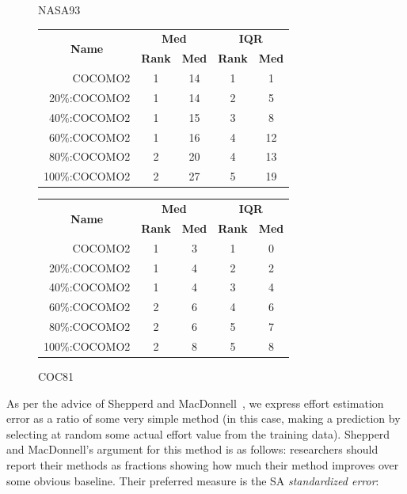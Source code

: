 \documentclass[final,twocolumn]{elsarticle}
\theoremstyle{break}
\begin{document}
\begin{figure}[!t]
\begin{center}
\caption{NASA93}
\scriptsize
\label{fig:nasa93}
\begin{tabular}{|r|c|c|c|c|}
\hline
\multicolumn{1}{|c|}{\multirow{2}{*}{\textbf{Name}}} & \multicolumn{2}{c|}{\textbf{Med}}     & \multicolumn{2}{c|}{\textbf{IQR}} \\ \cline{2-5} 
\multicolumn{1}{|c|}{}                               & \textbf{Rank} & \textbf{Med} & \textbf{Rank} & \textbf{Med} \\ \hline
    COCOMO2  & 1 & 14   & 1    & 1     \\ \cline{4-5}
20\%:COCOMO2 & 1 & 14   & 2    & 5  \\ \cline{4-5}
40\%:COCOMO2 & 1 & 15   & 3    & 8   \\ \cline{4-5}
60\%:COCOMO2 & 1 & 16   & 4    & 12   \\ \cline{2-3}
80\%:COCOMO2 & 2 & 20   & 4    & 13   \\\cline{4-5}
100\%:COCOMO2 & 2 & 27  & 5    & 19    \\ \hline  
\end{tabular}

\caption{COC81}
\scriptsize
\label{fig:coc81}
\begin{tabular}{|r|c|c|c|c|}
\hline
\multicolumn{1}{|c|}{\multirow{2}{*}{\textbf{Name}}} & \multicolumn{2}{c|}{\textbf{Med}}     & \multicolumn{2}{c|}{\textbf{IQR}} \\ \cline{2-5} 
\multicolumn{1}{|c|}{}                               & \textbf{Rank} & \textbf{Med} & \textbf{Rank} & \textbf{Med} \\ \hline
    COCOMO2  & 1 & 3   & 1    & 0     \\ \cline{4-5}
20\%:COCOMO2 & 1 & 4   & 2    & 2   \\ \cline{4-5}
40\%:COCOMO2 & 1 & 4   & 3    & 4   \\ \cline{2-5}
60\%:COCOMO2 & 2 & 6   & 4    & 6   \\ \cline{4-5}
80\%:COCOMO2 & 2 & 6   & 5    & 7   \\
100\%:COCOMO2 & 2 & 8  & 5    & 8    \\ \hline        
\end{tabular}
\end{center}
\end{figure}


As per the advice of Shepperd and MacDonnell~\cite{shepperd12a},
we express effort estimation error as a ratio of some very simple method (in this
case, making a prediction by selecting at random some actual effort value from the training data).
Shepperd and MacDonnell's argument for this method is as follows: researchers
should report their methods as fractions showing how much their method improves over
some obvious baseline. Their preferred measure is the SA {\em standardized error}:
\end{document}
